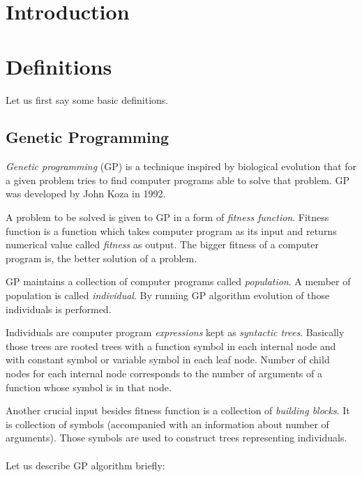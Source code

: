 \documentclass[12pt,a4paper]{report}
\newcommand{\Lets}{Let us }
\begin{document}
\newpage


\tableofcontents	
	
\chapter*{Introduction}
	
\chapter{Definitions}
	
	\Lets first say some basic definitions.

\section{Genetic Programming}

\textit{Genetic programming} (GP) is a technique inspired by biological evolution
that for a given problem tries to find computer programs able to solve that problem. 
GP was developed by John Koza \cite{koza92} in 1992.

A problem to be solved is given to GP in a form of \textit{fitness function}. 
Fitness function is a function which takes computer program as its input and 
returns numerical value called \textit{fitness} as output. 
The bigger fitness of a computer program is, the better solution of a problem.

GP maintains a collection of computer programs called \textit{population}. 
A member of population is called \textit{individual}. 
By running GP algorithm evolution of those individuals is performed.

Individuals are computer program \textit{expressions} kept as \textit{syntactic trees}. 
Basically those trees are rooted trees with a function symbol in each internal node 
and with constant symbol or variable symbol in each leaf node. 
Number of child nodes for each internal node corresponds to the number of arguments of a function whose symbol is in that node.

Another crucial input besides fitness function is a collection of \textit{building blocks}.
It is collection of symbols (accompanied with an information about number of arguments).
Those symbols are used to construct trees representing individuals.  
\\\\
\Lets describe GP algorithm briefly:
\end{document}
